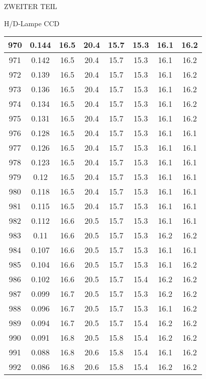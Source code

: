 \begin{appendix}
\begin{chapter}{ZWEITER TEIL}
\begin{section}{H/D-Lampe CCD}
\begin{scriptsize}
\begin{longtable}[htbp]{|c|c|c|c|c|c|c|c|}
            970 & 0.144 & 16.5 & 20.4 & 15.7 & 15.3 & 16.1 & 16.2 \\ \hline
            971 & 0.142 & 16.5 & 20.4 & 15.7 & 15.3 & 16.1 & 16.2 \\ \hline
            972 & 0.139 & 16.5 & 20.4 & 15.7 & 15.3 & 16.1 & 16.2 \\ \hline
            973 & 0.136 & 16.5 & 20.4 & 15.7 & 15.3 & 16.1 & 16.2 \\ \hline
            974 & 0.134 & 16.5 & 20.4 & 15.7 & 15.3 & 16.1 & 16.2 \\ \hline
            975 & 0.131 & 16.5 & 20.4 & 15.7 & 15.3 & 16.1 & 16.2 \\ \hline
            976 & 0.128 & 16.5 & 20.4 & 15.7 & 15.3 & 16.1 & 16.1 \\ \hline
            977 & 0.126 & 16.5 & 20.4 & 15.7 & 15.3 & 16.1 & 16.1 \\ \hline
            978 & 0.123 & 16.5 & 20.4 & 15.7 & 15.3 & 16.1 & 16.1 \\ \hline
            979 & 0.12 & 16.5 & 20.4 & 15.7 & 15.3 & 16.1 & 16.1 \\ \hline
            980 & 0.118 & 16.5 & 20.4 & 15.7 & 15.3 & 16.1 & 16.1 \\ \hline
            981 & 0.115 & 16.5 & 20.4 & 15.7 & 15.3 & 16.1 & 16.1 \\ \hline
            982 & 0.112 & 16.6 & 20.5 & 15.7 & 15.3 & 16.1 & 16.1 \\ \hline
            983 & 0.11 & 16.6 & 20.5 & 15.7 & 15.3 & 16.2 & 16.2 \\ \hline
            984 & 0.107 & 16.6 & 20.5 & 15.7 & 15.3 & 16.1 & 16.1 \\ \hline
            985 & 0.104 & 16.6 & 20.5 & 15.7 & 15.3 & 16.1 & 16.2 \\ \hline
            986 & 0.102 & 16.6 & 20.5 & 15.7 & 15.4 & 16.2 & 16.2 \\ \hline
            987 & 0.099 & 16.7 & 20.5 & 15.7 & 15.3 & 16.2 & 16.2 \\ \hline
            988 & 0.096 & 16.7 & 20.5 & 15.7 & 15.3 & 16.1 & 16.2 \\ \hline
            989 & 0.094 & 16.7 & 20.5 & 15.7 & 15.4 & 16.2 & 16.2 \\ \hline
            990 & 0.091 & 16.8 & 20.5 & 15.8 & 15.4 & 16.2 & 16.2 \\ \hline
            991 & 0.088 & 16.8 & 20.6 & 15.8 & 15.4 & 16.1 & 16.2 \\ \hline
            992 & 0.086 & 16.8 & 20.6 & 15.8 & 15.4 & 16.2 & 16.2 \\ \hline

\end{longtable}
\end{scriptsize}
\end{section}
\end{chapter}
\end{appendix}
